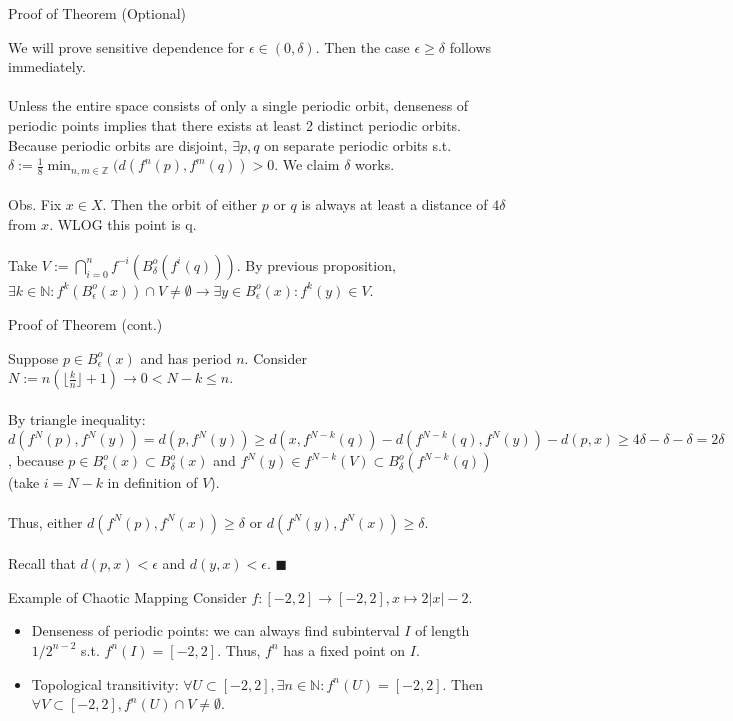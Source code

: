 \documentclass[aspectratio=169]{beamer}
\begin{document}
\begin{frame}{Proof of Theorem (Optional)}
    \begin{pf}
        We will prove sensitive dependence for $\epsilon \in (0,\delta)$. Then the case $\epsilon\geq\delta$ follows immediately. \\\\
        Unless the entire space consists of only a single periodic orbit, denseness of periodic points implies that there exists at least 2 distinct periodic orbits. Because periodic orbits are disjoint, $\exists p, q$ on separate periodic orbits s.t. $\delta := \frac18\displaystyle\min_{n,m\in\mathbb{Z}}(d(f^n(p),f^m(q)) > 0$. We claim $\delta$ works. \\\\
        Obs. Fix $x\in X$. Then the orbit of either $p$ or $q$ is always at least a distance of $4\delta$ from $x$. WLOG this point is q.\\\\
        Take $V:= \displaystyle\bigcap_{i=0}^n f^{-i}(B_\delta^o(f^i(q))).$  By previous proposition, $\exists k\in \mathbb{N}:f^k(B_\epsilon^o(x))\cap V\neq \emptyset \rightarrow \exists y\in B_\epsilon^o(x): f^k(y)\in V$. 
    \end{pf}
\end{frame}

\begin{frame}{Proof of Theorem (cont.)}
    \begin{pf}
        Suppose $p\in B_\epsilon^o(x)$ and has period $n$. Consider $N := n(\lfloor\frac{k}{n}\rfloor+1) \rightarrow 0 < N-k \leq n$. \\\\
        By triangle inequality: $d(f^N(p),f^N(y)) = d(p,f^N(y)) \geq d(x,f^{N-k}(q)) - d(f^{N-k}(q),f^N(y)) - d(p,x) \geq 4\delta -\delta -\delta = 2\delta$, because $p\in B_\epsilon^o(x) \subset B_\delta^o(x)$ and $f^N(y) \in f^{N-k}(V) \subset B_\delta^o(f^{N-k}(q))$ (take $i=N-k$ in definition of $V$). \\\\
        Thus, either $d(f^N(p),f^N(x)) \geq \delta$ or  $d(f^N(y),f^N(x)) \geq \delta$. \\\\
        Recall that $d(p,x)<\epsilon$ and $d(y,x)<\epsilon$. $\blacksquare$
    \end{pf}
\end{frame}

\begin{frame}{Example of Chaotic Mapping}
    Consider $f:[-2,2]\rightarrow [-2,2], x \mapsto 2|x|-2$. 
\begin{itemize}
    \item Denseness of periodic points: we can always find subinterval $I$ of length $1/2^{n-2}$ s.t. $f^n(I) = [-2,2].$ Thus, $f^n$ has a fixed point on $I$.
    \item Topological transitivity: $\forall U\subset [-2,2], \exists n\in\mathbb{N} : f^n(U) = [-2,2]$. Then $\forall V\subset [-2,2], f^n(U) \cap V \neq\emptyset.$ 
\end{itemize}
\end{frame}
\end{document}

